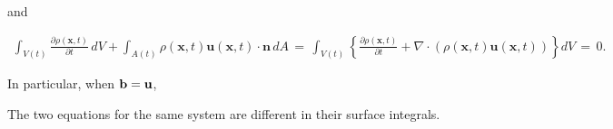 \documentclass{article}
\begin{document}
and

\begin{align*}
\int_{V ( t )} \frac{\partial\rho( \mathbf{x}, t )} {\partial t} \, d V+\int_{A ( t )} \rho( \mathbf{x}, t ) \mathbf{u} ( \mathbf{x}, t ) \cdot\mathbf{n} \, d A \,=\, \int_{V ( t )} \! \left\{\frac{\partial\rho( \mathbf{x}, t )} {\partial t}+\nabla\! \cdot\! \left( \rho( \mathbf{x}, t ) \mathbf{u} ( \mathbf{x}, t ) \right) \right\} d V \,=\, 0.
\end{align*}

In particular, when ${\bf b}={\bf u}$,

The two equations for the same system are different in their surface integrals.
\end{document}
